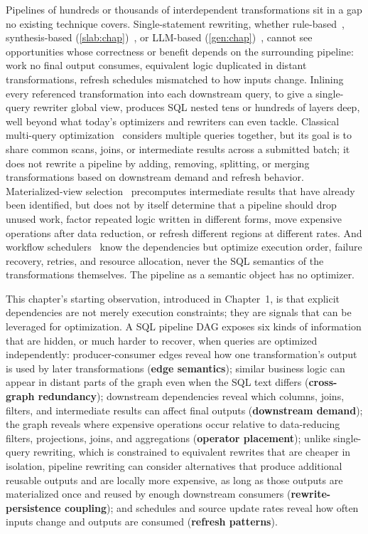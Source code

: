 Pipelines of hundreds or thousands of interdependent transformations
sit in a gap no existing technique covers. Single-statement rewriting,
whether rule-based~\cite{wetune}, synthesis-based
(\cref{slab:chap})~\cite{dong2023slabcity}, or LLM-based
(\cref{gen:chap})~\cite{genrewrite,sun2024r}, cannot see opportunities
whose correctness or benefit depends on the surrounding pipeline: work
no final output consumes, equivalent logic duplicated in distant
transformations, refresh schedules mismatched to how inputs change.
Inlining every referenced transformation into each downstream query,
to give a single-query rewriter global view, produces SQL nested tens
or hundreds of layers deep, well beyond what today's optimizers and
rewriters can even tackle. Classical multi-query
optimization~\cite{sellis1988multiple,roy2000efficient} considers
multiple queries together, but its goal is to share common scans,
joins, or intermediate results across a submitted batch; it does not
rewrite a pipeline by adding, removing, splitting, or merging
transformations based on downstream demand and refresh behavior.
Materialized-view
selection~\cite{harinarayan1996implementing,agrawal2000automated}
precomputes intermediate results that have already been identified,
but does not by itself determine that a pipeline should drop unused
work, factor repeated logic written in different forms, move expensive
operations after data reduction, or refresh different regions at
different rates. And workflow
schedulers~\cite{airflowDags,dagsterAssets,prefectTasks,argoDag} know
the dependencies but optimize execution order, failure recovery,
retries, and resource allocation, never the SQL semantics of the
transformations themselves. The pipeline as a semantic object has no
optimizer.

\label{dag:sec:dependencies-as-signals}
This chapter's starting observation, introduced in Chapter~1, is that
explicit dependencies are not merely execution constraints; they are
signals that can be leveraged for optimization. A SQL pipeline DAG
exposes six kinds of information that are hidden, or much harder to
recover, when queries are optimized independently: producer-consumer
edges reveal how one transformation's output is used by later
transformations (\textbf{edge semantics}); similar business logic can
appear in distant parts of the graph even when the SQL text differs
(\textbf{cross-graph redundancy}); downstream dependencies reveal
which columns, joins, filters, and intermediate results can affect
final outputs (\textbf{downstream demand}); the graph reveals where
expensive operations occur relative to data-reducing filters,
projections, joins, and aggregations (\textbf{operator placement});
unlike single-query rewriting, which is constrained to equivalent
rewrites that are cheaper in isolation, pipeline rewriting can
consider alternatives that produce additional reusable outputs and are
locally more expensive, as long as those outputs are materialized once
and reused by enough downstream consumers
(\textbf{rewrite-persistence coupling}); and schedules and source
update rates reveal how often inputs change and outputs are consumed
(\textbf{refresh patterns}).

